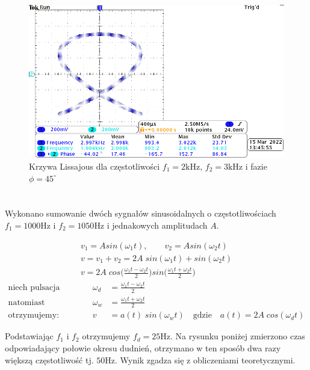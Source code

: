 \documentclass[11pt]{extarticle}
\begin{document}
	\begin{figure}[htp]
		\centering
		\includegraphics[width=\textwidth]{include/2/7.png}
		\caption{Krzywa Lissajous dla częstotliwości \(f_1=2\text{kHz}\), \(f_2=3\text{kHz}\) i fazie \(\phi=45^{\circ}\)}
	\end{figure}

	\clearpage 
	\section{}
	Wykonano sumowanie dwóch sygnałów sinusoidalnych o częstotliwościach \(f_1=1000\text{Hz}\) i \(f_2=1050\text{Hz}\) i jednakowych amplitudach \(A\).

	\begin{align}
		v_1 = A sin(\omega_1t), \qquad v_2 = A sin(\omega_2t) \\[10pt]
		v = v_1 + v_2 = 2A\;sin(\omega_1t) + sin(\omega_2t) \\[10pt]
		v = 2A\;
		cos \biggl(\frac{\omega_1t-\omega_2t}{2}\biggr)
		sin \biggl(\frac{\omega_1t+\omega_2t}{2}\biggr)
	\end{align}
	\begin{align}
		\text{niech pulsacja dudnień:} &&
		\quad \omega_d &= \frac	
		{\omega_1t-\omega_2t}{2} \\
		\text{natomiast pulsacja wypadkowa:} &&
		\quad \omega_w &= \frac{\omega_1t+\omega_2t}{2} \\
		\text{otrzymujemy:} &&
		\quad v &= a(t)\;sin(\omega_wt) \quad \text{gdzie} \quad a(t) = 2A\;cos(\omega_dt)
	\end{align}

	Podstawiając \(f_1\) i \(f_2\) otrzymujemy \(f_d=25\text{Hz}\).
	Na rysunku poniżej zmierzono czas odpowiadający połowie okresu dudnień, otrzymano w ten sposób dwa razy większą częstotliwość tj. \(50\text{Hz}\).
	Wynik zgadza się z obliczeniami teoretycznymi.
\end{document}
